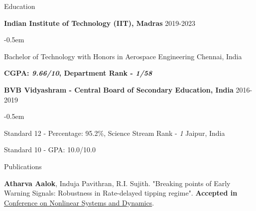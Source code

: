 \documentclass{resume} %
\begin{document}

\begin{rSection}{Education}

{\bf Indian Institute of Technology (IIT), Madras} \hfill {2019-2023}
\begin{list}{\raisebox{0.3ex}{\tiny$\bullet$}}{\leftmargin=1em}
   \itemsep -0.5em \vspace{-0.5em} %
   \item Bachelor of Technology with Honors in Aerospace Engineering \hfill {Chennai, India}
   \item \textbf{CGPA: \emph{9.66/10}, Department Rank - \emph{1/58}}
\end{list}

{\bf BVB Vidyashram - Central Board of Secondary Education, India} \hfill {2016-2019}
\begin{list}{\raisebox{0.3ex}{\tiny$\bullet$}}{\leftmargin=1em}
   \itemsep -0.5em \vspace{-0.5em} %
   \item Standard 12 - Percentage: 95.2\%, Science Stream Rank - \emph{1} \hfill {Jaipur, India}
   \item Standard 10 - GPA: 10.0/10.0
\end{list}

\end{rSection}


\begin{rSection}{Publications}

\textbf{Atharva Aalok}, Induja Pavithran, R.I. Sujith. "Breaking points of Early Warning Signals: Robustness in
Rate-delayed tipping regime". \textbf{Accepted in} \href{http://sites.iiserpune.ac.in/~cnsd2022/}{Conference on Nonlinear Systems and Dynamics}.

\end{rSection}

\end{document}
